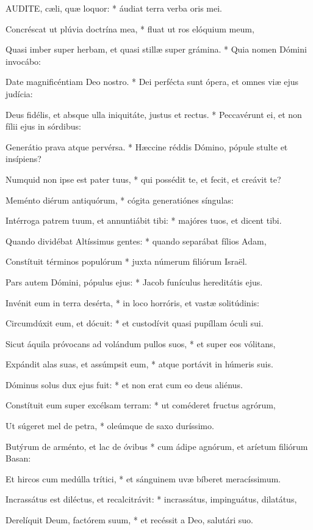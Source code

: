 \lettrine[lines=2]{A}{UDITE}, cæli, quæ loquor: * áudiat terra verba oris mei.

Concréscat ut plúvia doctrína mea, * fluat ut ros elóquium meum,

Quasi imber super herbam, et quasi stillæ super grámina. * Quia nomen Dómini invocábo:

Date magnificéntiam Deo nostro. * Dei perfécta sunt ópera, et omnes viæ ejus judícia:

Deus fidélis, et absque ulla iniquitáte, justus et rectus. * Peccavérunt ei, et non fílii ejus in sórdibus:

Generátio prava atque pervérsa. * Hæccine réddis Dómino, pópule stulte et insípiens?

Numquid non ipse est pater tuus, * qui possédit te, et fecit, et creávit te?

Meménto diérum antiquórum, * cógita generatiónes síngulas:

Intérroga patrem tuum, et annuntiábit tibi: * majóres tuos, et dicent tibi.

Quando dividébat Altíssimus gentes: * quando separábat fílios Adam,

Constítuit términos populórum * juxta númerum filiórum Israël.

Pars autem Dómini, pópulus ejus: * Jacob funículus hereditátis ejus.

Invénit eum in terra desérta, * in loco horróris, et vastæ solitúdinis:

Circumdúxit eum, et dócuit: * et custodívit quasi pupíllam óculi sui.

Sicut áquila próvocans ad volándum pullos suos, * et super eos vólitans,

Expándit alas suas, et assúmpsit eum, * atque portávit in húmeris suis.

Dóminus solus dux ejus fuit: * et non erat cum eo deus aliénus.

Constítuit eum super excélsam terram: * ut coméderet fructus agrórum,

Ut súgeret mel de petra, * oleúmque de saxo duríssimo.

Butýrum de arménto, et lac de óvibus * cum ádipe agnórum, et aríetum filiórum Basan:

Et hircos cum medúlla trítici, * et sánguinem uvæ bíberet meracíssimum.

Incrassátus est diléctus, et recalcitrávit: * incrassátus, impinguátus, dilatátus,

Derelíquit Deum, factórem suum, * et recéssit a Deo, salutári suo.

